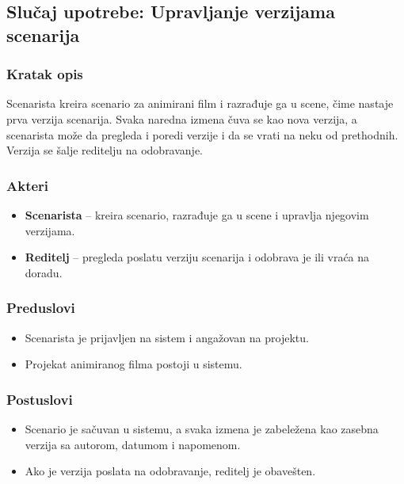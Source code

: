 \subsection{Slučaj upotrebe: Upravljanje verzijama scenarija}

\subsubsection*{Kratak opis}

Scenarista kreira scenario za animirani film i razrađuje ga u scene, čime
nastaje prva verzija scenarija. Svaka naredna izmena čuva se kao nova verzija,
a scenarista može da pregleda i poredi verzije i da se vrati na neku od
prethodnih. Verzija se šalje reditelju na odobravanje.

\subsubsection*{Akteri}
\begin{itemize}
    \item \textbf{Scenarista} -- kreira scenario, razrađuje ga u scene i upravlja njegovim verzijama.
    \item \textbf{Reditelj} -- pregleda poslatu verziju scenarija i odobrava je ili vraća na doradu.
\end{itemize}

\subsubsection*{Preduslovi}
\begin{itemize}
    \item Scenarista je prijavljen na sistem i angažovan na projektu.
    \item Projekat animiranog filma postoji u sistemu.
\end{itemize}

\subsubsection*{Postuslovi}
\begin{itemize}
    \item Scenario je sačuvan u sistemu, a svaka izmena je zabeležena kao zasebna verzija sa autorom, datumom i napomenom.
    \item Ako je verzija poslata na odobravanje, reditelj je obavešten.
\end{itemize}

